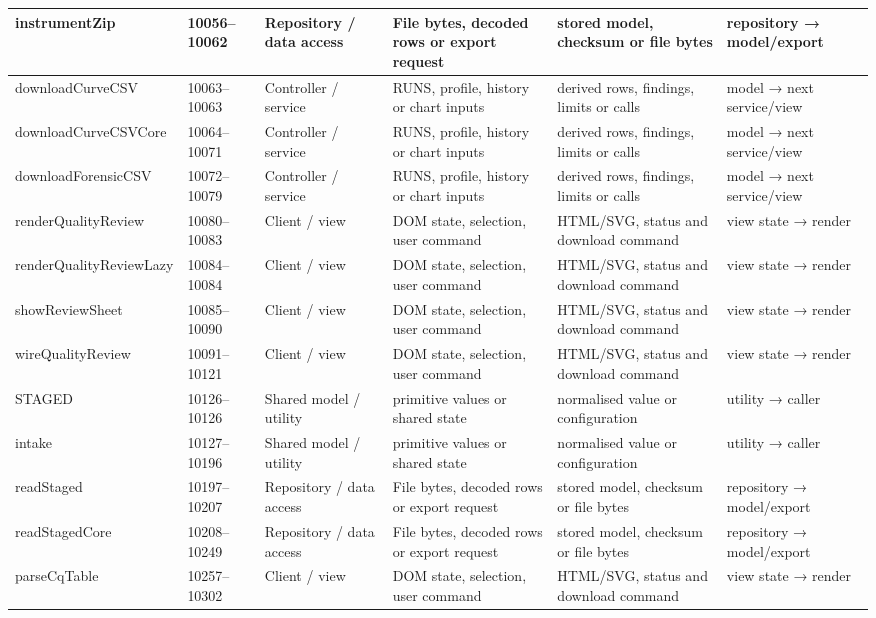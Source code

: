 \begin{landscape}
\begin{longtable}{@{}p{3.2cm}p{1.45cm}p{2.7cm}p{4.0cm}p{4.0cm}p{3.0cm}@{}}
instrumentZip & 10056--10062 & Repository / data access & File bytes, decoded rows or export request & stored model, checksum or file bytes & repository → model/export \\\hline
downloadCurveCSV & 10063--10063 & Controller / service & RUNS, profile, history or chart inputs & derived rows, findings, limits or calls & model → next service/view \\\hline
downloadCurveCSVCore & 10064--10071 & Controller / service & RUNS, profile, history or chart inputs & derived rows, findings, limits or calls & model → next service/view \\\hline
downloadForensicCSV & 10072--10079 & Controller / service & RUNS, profile, history or chart inputs & derived rows, findings, limits or calls & model → next service/view \\\hline
renderQualityReview & 10080--10083 & Client / view & DOM state, selection, user command & HTML/SVG, status and download command & view state → render \\\hline
renderQualityReviewLazy & 10084--10084 & Client / view & DOM state, selection, user command & HTML/SVG, status and download command & view state → render \\\hline
showReviewSheet & 10085--10090 & Client / view & DOM state, selection, user command & HTML/SVG, status and download command & view state → render \\\hline
wireQualityReview & 10091--10121 & Client / view & DOM state, selection, user command & HTML/SVG, status and download command & view state → render \\\hline
STAGED & 10126--10126 & Shared model / utility & primitive values or shared state & normalised value or configuration & utility → caller \\\hline
intake & 10127--10196 & Shared model / utility & primitive values or shared state & normalised value or configuration & utility → caller \\\hline
readStaged & 10197--10207 & Repository / data access & File bytes, decoded rows or export request & stored model, checksum or file bytes & repository → model/export \\\hline
readStagedCore & 10208--10249 & Repository / data access & File bytes, decoded rows or export request & stored model, checksum or file bytes & repository → model/export \\\hline
parseCqTable & 10257--10302 & Client / view & DOM state, selection, user command & HTML/SVG, status and download command & view state → render \\\hline

\end{longtable}
\end{landscape}
